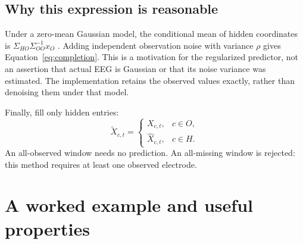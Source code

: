 \documentclass[11pt,a4paper]{article}
\begin{document}
\subsection{Why this expression is reasonable}
Under a zero-mean Gaussian model, the conditional mean of hidden coordinates
is $\Sigma_{HO}\Sigma_{OO}^{-1}x_O$ \cite{gpml}. Adding independent observation
noise with variance $\rho$ gives Equation~\eqref{eq:completion}. This is a
motivation for the regularized predictor, not an assertion that actual EEG is
Gaussian or that its noise variance was estimated. The implementation retains
the observed values exactly, rather than denoising them under that model.

Finally, fill only hidden entries:
\begin{equation}
 \widetilde X_{c,t}=\begin{cases}X_{c,t},&c\in O,\\
 \widehat X_{c,t},&c\in H.\end{cases}
 \label{eq:copy}
\end{equation}
An all-observed window needs no prediction. An all-missing window is rejected:
this method requires at least one observed electrode.

\newpage
\section{A worked example and useful properties}
\end{document}
